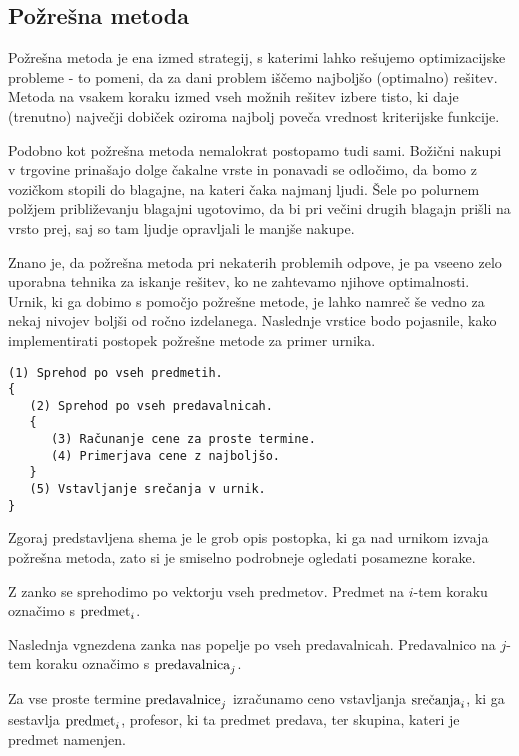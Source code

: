 \documentclass[10pt, a4paper]{article}
\begin{document}
\subsection{Požrešna metoda}

Požrešna metoda je ena izmed strategij, s katerimi lahko rešujemo optimizacijske probleme -
to pomeni, da za dani problem iščemo najboljšo (optimalno) rešitev. Metoda na vsakem koraku
izmed vseh možnih rešitev izbere  tisto, ki daje (trenutno) največji dobiček oziroma najbolj
poveča vrednost kriterijske funkcije.

Podobno kot požrešna metoda nemalokrat postopamo tudi sami. Božični nakupi v trgovine
prinašajo dolge čakalne vrste in ponavadi se odločimo, da bomo z vozičkom stopili do blagajne,
na kateri čaka najmanj ljudi. Šele po polurnem polžjem približevanju blagajni ugotovimo,
da bi pri večini drugih blagajn prišli na vrsto prej, saj so tam ljudje opravljali le
manjše nakupe.

Znano je, da požrešna metoda pri nekaterih problemih odpove, je pa vseeno zelo uporabna
tehnika za iskanje rešitev, ko ne zahtevamo njihove optimalnosti. Urnik, ki ga dobimo s
pomočjo požrešne metode, je lahko namreč še vedno za nekaj nivojev boljši od ročno izdelanega.
Naslednje vrstice bodo pojasnile, kako implementirati postopek požrešne metode za primer urnika.

\begin{verbatim}
(1) Sprehod po vseh predmetih.
{
   (2) Sprehod po vseh predavalnicah.
   {
      (3) Računanje cene za proste termine.
      (4) Primerjava cene z najboljšo.
   }
   (5) Vstavljanje srečanja v urnik.
}
\end{verbatim}

\noindent Zgoraj predstavljena shema je le grob opis postopka, ki ga nad urnikom izvaja požrešna metoda,
zato si je smiselno podrobneje ogledati posamezne korake.

   Z zanko se sprehodimo po vektorju vseh predmetov. Predmet na $i$-tem koraku
   označimo s $\textnormal{predmet}_i$.

   Naslednja vgnezdena zanka nas popelje po vseh predavalnicah. Predavalnico na
   $j$-tem koraku označimo s $\textnormal{predavalnica}_j$.

   Za vse proste termine $\textnormal{predavalnice}_j$ izračunamo ceno vstavljanja
   $\textnormal{srečanja}_i$, ki ga sestavlja $\textnormal{predmet}_i$, profesor, ki ta predmet predava,
   ter skupina, kateri je predmet namenjen.
\end{document}
